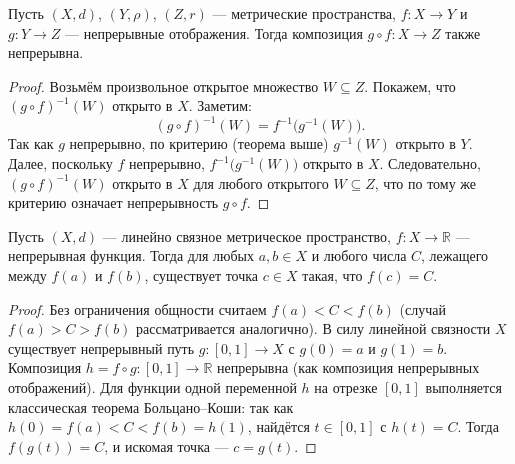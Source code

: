 \begin{theorem}
    Пусть $(X, d)$, $(Y, \rho)$, $(Z, r)$ --- метрические пространства, $f : X \to Y$ и $g : Y \to Z$ --- непрерывные отображения. Тогда композиция $g \circ f : X \to Z$ также непрерывна.
    \begin{proof}
        Возьмём произвольное открытое множество $W \subseteq Z$. Покажем, что $(g \circ f)^{-1}(W)$ открыто в $X$. Заметим:
        \[
            (g \circ f)^{-1}(W) = f^{-1}\bigl(g^{-1}(W)\bigr).
        \]
        Так как $g$ непрерывно, по критерию (теорема выше) $g^{-1}(W)$ открыто в $Y$. Далее, поскольку $f$ непрерывно, $f^{-1}\bigl(g^{-1}(W)\bigr)$ открыто в $X$. Следовательно, $(g \circ f)^{-1}(W)$ открыто в $X$ для любого открытого $W \subseteq Z$, что по тому же критерию означает непрерывность $g \circ f$.
    \end{proof}
\end{theorem}

\begin{theorem}
    Пусть $(X, d)$ --- линейно связное метрическое пространство, $f : X \to \mathbb{R}$ --- непрерывная функция. Тогда для любых $a, b \in X$ и любого числа $C$, лежащего между $f(a)$ и $f(b)$, существует точка $c \in X$ такая, что $f(c) = C$.
    \begin{proof}
        Без ограничения общности считаем $f(a) < C < f(b)$ (случай $f(a) > C > f(b)$ рассматривается аналогично). В силу линейной связности $X$ существует непрерывный путь $g : [0,1] \to X$ с $g(0)=a$ и $g(1)=b$. Композиция $h = f \circ g : [0,1] \to \mathbb{R}$ непрерывна (как композиция непрерывных отображений). Для функции одной переменной $h$ на отрезке $[0,1]$ выполняется классическая теорема Больцано--Коши: так как $h(0)=f(a) < C < f(b)=h(1)$, найдётся $t \in [0,1]$ с $h(t)=C$. Тогда $f(g(t)) = C$, и искомая точка --- $c = g(t)$.
    \end{proof}
\end{theorem}




